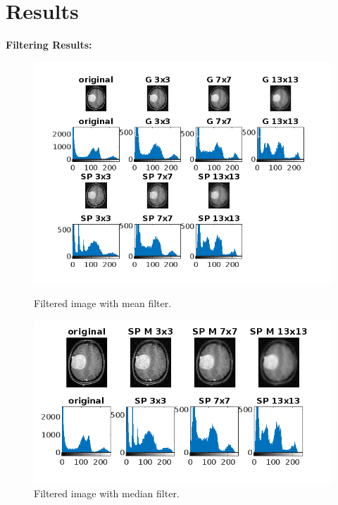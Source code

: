 \documentclass[11pt,letterpaper,twocolumn]{article}
\begin{document}
\section{Results}
\justify


\textbf{Filtering Results:}
\begin{figure}[H]
    \centering
    \begin{minipage}{0.45\textwidth}
        \centering
        \includegraphics[width=\textwidth]{results/Figure 1.png}
        \caption{Filtered image with mean filter.}
        \label{fig:mean_filter_7x7}
    \end{minipage}\hfill
    \begin{minipage}{0.45\textwidth}
        \centering
        \includegraphics[width=\textwidth]{results/Figure 2.png}
        \caption{Filtered image with median filter.}
        \label{fig:median_filter_7x7}
    \end{minipage}
\end{figure}
\end{document}
